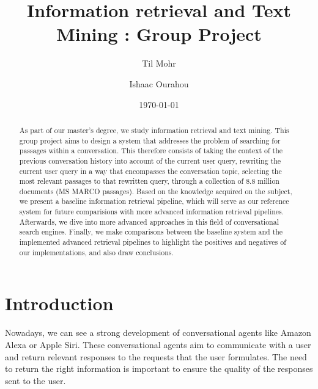 \documentclass[sigconf]{acmart}
\begin{document}
\title{Information retrieval and Text Mining : Group Project}

\author{Til Mohr}
\affiliation{}

\author{Ishaac Ourahou}
\affiliation{}

\date{\today}



\begin{abstract}
As part of our master's degree, we study information retrieval and text mining. This group project aims to design a system that addresses the problem of searching for passages within a conversation. This therefore consists of taking the context of the previous conversation history into account of the current user query, rewriting the current user query in a way that encompasses the conversation topic, selecting the most relevant passages to that rewritten query, through a collection of 8.8 million documents (MS MARCO passages). Based on the knowledge acquired on the subject, we present a baseline information retrieval pipeline, which will serve as our reference system for future comparisions with more advanced information retrieval pipelines. Afterwards, we dive into more advanced approaches in this field of conversational search engines. Finally, we make comparisons between the baseline system and the implemented advanced retrieval pipelines to highlight the positives and negatives of our implementations, and also draw conclusions.
\end{abstract}


\renewcommand\footnotetextcopyrightpermission[1]{}
\pagestyle{plain}

\maketitle


\section{Introduction}\label{sec:intro}
Nowadays, we can see a strong development of conversational agents like Amazon Alexa or Apple Siri. These conversational agents aim to communicate with a user and return relevant responses to the requests that the user formulates. The need to return the right information is important to ensure the quality of the responses sent to the user.
\end{document}
